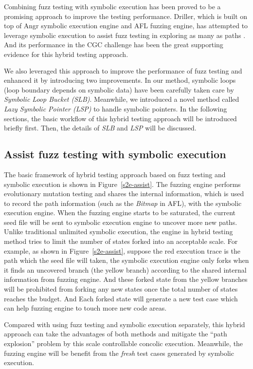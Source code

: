 Combining fuzz testing with symbolic execution has been proved to be a promising approach to improve the testing performance. Driller, which is built on top of Angr symbolic execution engine and AFL fuzzing engine, has attempted to leverage symbolic execution to assist fuzz testing in exploring as many as paths \cite{stephens2016driller}. And its performance in the CGC challenge \cite{online:CGC} has been the great supporting evidence for this hybrid testing approach. 

We also leveraged this approach to improve the performance of fuzz testing and enhanced it by introducing two improvements. In our method, symbolic loops (loop boundary depends on symbolic data) have been carefully taken care by \textit{Symbolic Loop Bucket (SLB)}. Meanwhile, we introduced a novel method called \textit{Lazy Symbolic Pointer (LSP)} to handle symbolic pointers. In the following sections, the basic workflow of this hybrid testing approach will be introduced briefly first. Then, the details of \textit{SLB} and \textit{LSP} will be discussed.

\subsection{Assist fuzz testing with symbolic execution}
The basic framework of hybrid testing approach based on fuzz testing and symbolic execution is shown in Figure~\ref{s2e-assist}. The fuzzing engine performs evolutionary mutation testing and shares the internal information, which is used to record the path information (such as the \textit{Bitmap} in AFL), with the symbolic execution engine. 
When the fuzzing engine starts to be saturated, the current seed file will be sent to symbolic execution engine to uncover more new paths. 
Unlike traditional unlimited symbolic execution, the engine in hybrid testing method tries to limit the number of states forked into an acceptable scale. For example, as shown in Figure~\ref{s2e-assist}, suppose the red execution trace is the path which the seed file will taken, the symbolic execution engine only forks when it finds an uncovered branch (the yellow branch) according to the shared internal information from fuzzing engine. And these forked state from the yellow branches will be prohibited from forking any new states once the total number of states reaches the budget. And Each forked state will generate a new test case which can help fuzzing engine to touch more new code areas. 

Compared with using fuzz testing and symbolic execution separately, this hybrid approach can take the advantages of both methods and mitigate the ``path explosion'' problem by this scale controllable concolic execution. Meanwhile, the fuzzing engine will be benefit from the \textit{fresh} test cases generated by symbolic execution.

